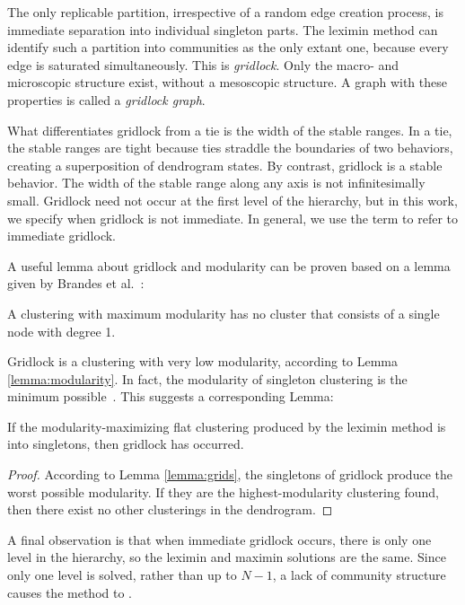The only replicable partition, irrespective of a random edge creation process, is immediate separation into individual singleton parts. The leximin method can identify such a partition into communities as the only extant one, because every edge is saturated simultaneously. This is \emph{gridlock}. Only the macro- and microscopic structure exist, without a mesoscopic structure. A graph with these properties is called a \emph{gridlock graph}.

What differentiates gridlock from a tie is the width of the stable ranges. In a tie, the stable ranges are tight because ties straddle the boundaries of two behaviors, creating a superposition of dendrogram states. By contrast, gridlock is a stable behavior. The width of the stable range along any axis is not infinitesimally small. Gridlock need not occur at the first level of the hierarchy, but in this work, we specify when gridlock is not immediate. In general, we use the term to refer to immediate gridlock.

A useful lemma about gridlock and modularity can be proven based on a lemma given by Brandes et al.~\cite{brandes2007finding}:
\begin{lemma}
\label{lemma:modularity}

A clustering with maximum modularity has no cluster that consists of a single node with degree 1.
\end{lemma}

Gridlock is a clustering with very low modularity, according to Lemma \autoref{lemma:modularity}. In fact, the modularity of singleton clustering is the minimum possible~\cite{brandes2008modularity}. This suggests a corresponding Lemma:

\begin{lemma}
\label{lemma:grids}

If the modularity-maximizing flat clustering produced by the leximin method is into singletons, then gridlock has occurred. 
\end{lemma}

\begin{proof}
According to Lemma \autoref{lemma:grids}, the singletons of gridlock produce the worst possible modularity. If they are the highest-modularity clustering found, then there exist no other clusterings in the dendrogram. 
\end{proof}

A final observation is that when immediate gridlock occurs, there is only one level in the hierarchy, so the leximin and maximin solutions are the same. Since only one level is solved, rather than up to $N - 1$, a lack of community structure causes the method to .



